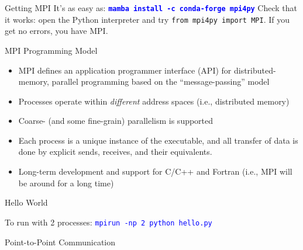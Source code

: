 \documentclass[10pt,handout]{beamer}
\begin{document}
\begin{frame}{Getting MPI}
It's as easy as:
\vfill
 {\Large\bf \textcolor{blue}{\tt mamba install -c conda-forge mpi4py}}
\vfill
Check that it works: open the Python interpreter and 
try {\tt from mpi4py import MPI}. If you get no errors, you have MPI.
\end{frame}


\begin{frame}{MPI Programming Model}

\begin{itemize}
 \item MPI defines an application programmer interface (API) for 
       distributed-memory, parallel programming based on the ``message-passing'' model
 \item Processes operate within {\it different} address spaces (i.e., distributed memory)
 \item Coarse- (and some fine-grain) parallelism is supported
 \item Each process is a unique instance of the executable, and all transfer of 
       data is done by explicit sends, receives, and their equivalents.
\item  Long-term development and support for C/C++ and Fortran (i.e.,
       MPI will be around for a long time)
\end{itemize}

\end{frame}

\begin{frame}{Hello World}



\vfill 

To run with 2 processes: \textcolor{blue}{{\tt mpirun -np 2 python hello.py}}

\end{frame}

\begin{frame}{Point-to-Point Communication}



\end{frame}
\end{document}
